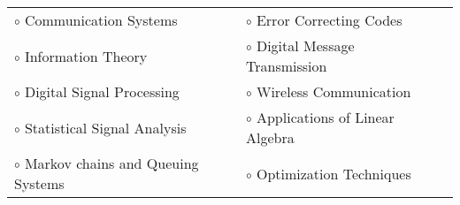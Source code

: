 \documentclass[a4paper,10pt]{article}
\begin{document}
 \begin{tabular}{p{3.5in}p{5in}p{3.5in}}
     $\circ$ Communication Systems		&$\circ$ Error Correcting Codes \\
    $\circ$ Information Theory			&$\circ$ Digital Message Transmission \\
    $\circ$ Digital Signal Processing		&$\circ$ Wireless Communication \\
    $\circ$ Statistical Signal Analysis	&$\circ$ Applications of Linear Algebra \\
    $\circ$ Markov chains and Queuing Systems	&$\circ$ Optimization Techniques \\
\end{tabular}






\end{document}
